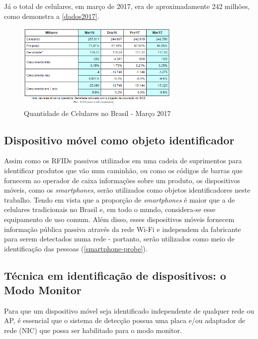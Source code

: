 Já o total de celulares, em março de 2017, era de aproximadamente 242 milhões, como demonstra a \autoref{dados2017}.

\begin{figure}[!h]
  \caption{\label{dados2017}Quantidade de Celulares no Brasil - Março 2017}
  \begin{center}
    \includegraphics[width=0.7\textwidth]{img/dados2017.png}
  \end{center}
\end{figure}

\subsection{Dispositivo móvel como objeto identificador}
\label{dispositivo-coisa}
Assim como os RFIDs passivos utilizados em uma cadeia de suprimentos para identificar produtos que vão num caminhão, ou como os códigos de barras
que fornecem ao operador de caixa informações sobre um produto, os dispositivos móveis, como os \emph{smartphones}, serão utilizados
como objetos identificadores neste trabalho. Tendo em vista que a proporção de \emph{smartphones} é maior que a de celulares tradicionais no Brasil e, em
todo o mundo, considera-se esse equipamento de uso comum. Além disso, esses dispositivos móveis fornecem informação pública passiva
através da rede Wi-Fi e independem da fabricante para serem detectados numa rede - portanto, serão utilizados como meio
de identificação das pessoas (\autoref{smartphone-probe}).

\subsection{Técnica em identificação de dispositivos: o Modo Monitor}
\label{modo-monitor}
Para que um dispositivo móvel seja identificado independente de qualquer rede ou AP, é essencial que o sistema de detecção possua uma placa e/ou adaptador de rede (NIC) que possa ser habilitado para o modo monitor.

